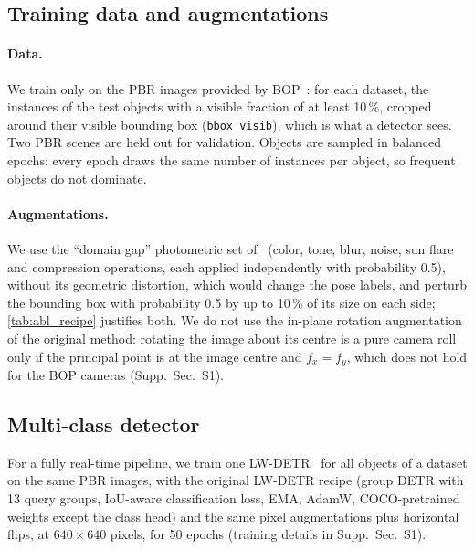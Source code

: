 \subsection{Training data and augmentations}
\label{sec:method:training}

\paragraph{Data.}
We train only on the PBR images provided by BOP~\cite{denninger2019blenderproc}: for each
dataset, the instances of the test objects with a visible fraction of at least 10\,\%, cropped
around their visible bounding box (\texttt{bbox\_visib}), which is what a detector sees. Two PBR
scenes are held out for validation. Objects are sampled in balanced epochs: every epoch draws the
same number of instances per object, so frequent objects do not dominate.

\paragraph{Augmentations.}
We use the ``domain gap'' photometric set of~\cite{ancey2026fastposevit} (color, tone, blur,
noise, sun flare and compression operations, each applied independently with probability 0.5),
without its geometric distortion, which would change the pose labels, and perturb the bounding
box with probability 0.5 by up to 10\,\% of its size on each side; \cref{tab:abl_recipe} justifies
both. We do not use the in-plane rotation augmentation of the original method: rotating the image
about its centre is a pure camera roll only if the principal point is at the image centre and
$f_x = f_y$, which does not hold for the BOP cameras (Supp.~Sec.~S1).

\subsection{Multi-class detector}
\label{sec:method:detector}
For a fully real-time pipeline, we train one LW-DETR~\cite{chen2024lwdetr} for all objects of a
dataset on the same PBR images, with the original LW-DETR recipe (group DETR with 13 query
groups, IoU-aware classification loss, EMA, AdamW, COCO-pretrained weights except the class head)
and the same pixel augmentations plus horizontal flips, at $640 \times 640$ pixels, for 50 epochs
(training details in Supp.~Sec.~S1).
